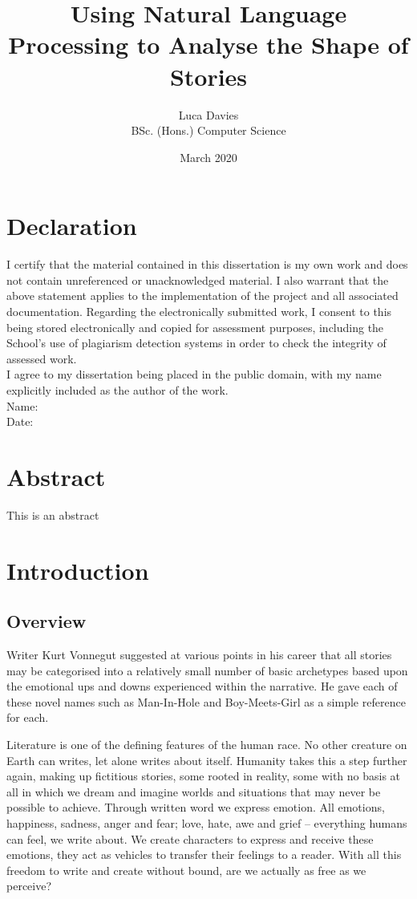 \documentclass{article}
\title{\textbf{Using Natural Language Processing to Analyse the Shape of Stories}}
\author{
Luca Davies \\ BSc. (Hons.) Computer Science}
\date{March 2020}
\begin{document}
\maketitle
\newpage
\section*{Declaration}
    I certify that the material contained in this dissertation is my own work and does not contain unreferenced or unacknowledged material. I also warrant that the above statement applies to the implementation of the project and all associated documentation. Regarding the electronically submitted work, I consent to this being stored electronically and copied for assessment purposes, including the School’s use of plagiarism detection systems in order to check the integrity of assessed work. \\
    I agree to my dissertation being placed in the public domain, with my name explicitly included as the author of the work. \\
    
    \noindent
    Name: \\
    Date:
\newpage
\section*{Abstract}
    This is an abstract
\newpage
\tableofcontents
\newpage
\section{Introduction}
    \subsection{Overview}
        Writer Kurt Vonnegut suggested at various points in his career that all stories may be categorised into a relatively small number of basic archetypes based upon the emotional ups and downs experienced within the narrative. He gave each of these novel names such as Man-In-Hole and Boy-Meets-Girl as a simple reference for each.

        Literature is one of the defining features of the human race. No other creature on Earth can writes, let alone writes about itself. Humanity takes this a step further again, making up fictitious stories, some rooted in reality, some with no basis at all in which we dream and imagine worlds and situations that may never be possible to achieve. Through written word we express emotion. All emotions, happiness, sadness, anger and fear; love, hate, awe and grief – everything humans can feel, we write about. We create characters to express and receive these emotions, they act as vehicles to transfer their feelings to a reader. With all this freedom to write and create without bound, are we actually as free as we perceive?
\end{document}
